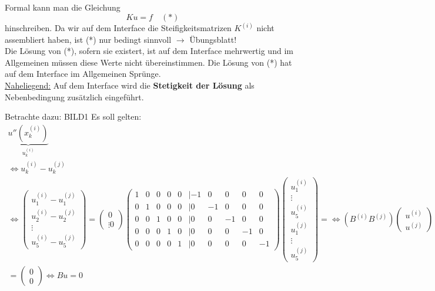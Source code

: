 Formal kann man die Gleichung 
\begin{equation}
  Ku=f \quad (*)
\end{equation}
hinschreiben. Da wir auf dem Interface die Steifigkeitsmatrizen $K^{(i)}$ nicht assembliert haben, ist (*) nur bedingt sinnvoll $\rightarrow$ Übungsblatt!\\
Die Lösung von (*), sofern sie existert, ist auf dem Interface mehrwertig und im Allgemeinen müssen diese Werte nicht übereinstimmen. Die Lösung von (*) hat auf dem Interface im Allgemeinen Sprünge.\\

\underline{Naheliegend:} Auf dem Interface wird die \textbf{Stetigkeit der Lösung} als Nebenbedingung zusätzlich eingeführt.

Betrachte dazu:
BILD1
Es soll gelten: 
\begin{align}
  \underbrace{u''(x_k^{(i)})}_{u_k^{(i)}} &= \underbrace{u_k^{(j)}}_{u_k^{(j)}} \quad \forall k=1,\cdots ,5\\
  \Leftrightarrow u_k^{(i)} - u_k^{(j)} &= 0 \quad \forall k=1,\cdots ,5\\
  \Leftrightarrow 
  \begin{pmatrix}
    u_1^{(i)}-u_1^{(j)}\\
    u_2^{(i)}-u_2^{(j)}\\
    \vdots\\
    u_5^{(i)}-u_5^{(j)}  
  \end{pmatrix}
  =
  \begin{pmatrix}
    0\\ \vdots 0
  \end{pmatrix}
  \begin{pmatrix}
    1& 0& 0& 0& 0& | -1& 0& 0& 0& 0\\
    0& 1& 0& 0& 0& | 0& -1& 0& 0& 0\\
    0& 0& 1& 0& 0& | 0& 0& -1& 0& 0\\
    0& 0& 0& 1& 0& | 0& 0& 0& -1& 0\\
    0& 0& 0& 0& 1& | 0& 0& 0& 0& -1
  \end{pmatrix}
  \begin{pmatrix}
    u^{(i)}_1\\
    \vdots\\
    u^{(i)}_5\\
    u^{(j)}_1\\
    \vdots\\
    u^{(j)}_5
  \end{pmatrix}
  = 
  \Leftrightarrow
  (B^{(i)} B^{(j)}) %
  \begin{pmatrix}
    u^{(i)}\\
    u^{(j)}
  \end{pmatrix}\\
  =
  \begin{pmatrix}
    0\\
    0
  \end{pmatrix}
  \Leftrightarrow 
  Bu=0
\end{align}

